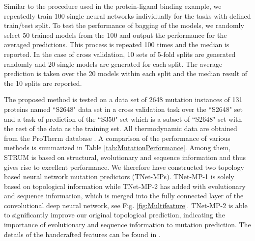 \documentclass[10pt]{article}
\begin{document}
Similar to the procedure used in the protein-ligand binding example, we repeatedly train 100 single neural networks individually for the tasks with defined train/test split. To test the performance of bagging of the models, we randomly select 50 trained models from the 100 and output the performance for the averaged predictions. This process is repeated 100 times and the median is reported. In the case of cross validation, 10 sets of 5-fold splits are generated randomly and 20 single models are generated for each split. The average prediction is taken over the 20 models within each split and the median result of the 10 splits are reported.

The proposed method is tested on a data set of 2648 mutation instances of 131 proteins named ``S2648" data set \cite{Dehouck:2009} in a cross validation task over the ``S2648" set and a task of prediction of the ``S350" set which is a subset of ``S2648" set with the rest of the data as the training set. All thermodynamic data are obtained from the ProTherm database \cite{Bava:2004}. A comparison of the performance of various  methods is summarized in Table \ref{tab:MutationPerformance}.  Among them,  STRUM \cite{LJQuan:2016} is based on structural, evolutionary and sequence information and thus gives rise to excellent performance. We therefore have constructed two topology based neural network  mutation predictors (TNet-MPs).    TNet-MP-1 is solely based on topological information while   TNet-MP-2 has added with evolutionary and sequence  information, which is merged into the fully connected layer of the convolutional deep neural network, see Fig. \ref{fig:Multifeature}. TNet-MP-2 is able to significantly improve our original topological prediction, indicating the importance of  evolutionary and sequence information to mutation prediction. The details of the handcrafted features can be found in \cite{Tmutation}.
\end{document}

